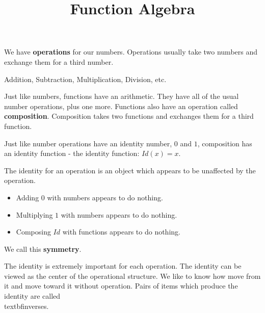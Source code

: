 \documentclass{ximera}
\title{Function Algebra}
\begin{document}
\begin{abstract}

\end{abstract}
\maketitle
















We have \textbf{operations} for our numbers.  Operations usually take two numbers and exchange them for a third number.

\begin{center}
Addition, Subtraction, Multiplication, Division, etc.
\end{center}



Just like numbers, functions have an arithmetic.  They have all of the usual number operations, plus one more.  Functions also have an operation called \textbf{\textcolor{purple!85!blue}{composition}}.  Composition takes two functions and exchanges them for a third function.

Just like number operations have an identity number, $0$ and $1$, composition has an identity function - the identity function: $Id(x) = x$.


The identity for an operation is an object which appears to be unaffected by the operation.  


\begin{itemize}
\item Adding $0$ with numbers appears to do nothing.
\item Multiplying $1$ with numbers appears to do nothing.
\item Composing $Id$ with functions appears to do nothing.
\end{itemize}




We call this \textbf{symmetry}.



The identity is extremely important for each operation.  The identity can be viewed as the center of the operational structure.  We like to know how move from it and move toward it without operation.  Pairs of items which produce the identity are called \\textbf{\textcolor{purple!85!blue}{inverses}}.
\end{document}
